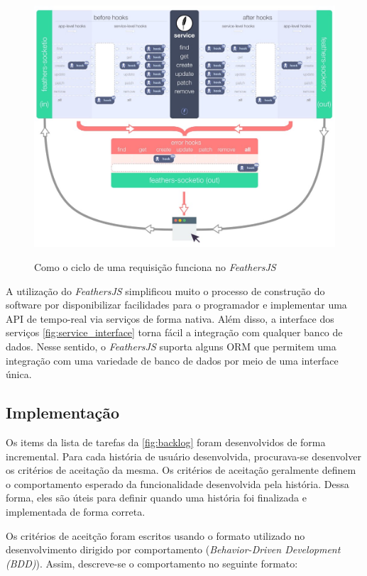 \begin{figure}[!ht]
  \centering
  \caption{Como o ciclo de uma requisição funciona no \textit{FeathersJS}}
  \includegraphics[scale=0.45,valign=t]{imagens/feathers_request.jpeg}
  \fonte{}
  \label{fig:feathers_request}
\end{figure}

A utilização do \textit{FeathersJS} simplificou muito o processo de construção
do software por disponibilizar facilidades para o programador e implementar
uma API de tempo-real via serviços de forma nativa. Além disso, a interface dos
serviços \autoref{fig:service_interface} torna fácil a integração com qualquer banco de dados.
Nesse sentido, o \textit{FeathersJS} suporta alguns ORM que permitem uma integração
com uma variedade de banco de dados por meio de uma interface única.

\subsection{Implementação}\label{subsection:implementation}

Os items da lista de tarefas da \autoref{fig:backlog} foram desenvolvidos de forma incremental.
Para cada história de usuário desenvolvida, procurava-se desenvolver os critérios de aceitação da mesma.
Os critérios de aceitação geralmente definem o comportamento esperado da funcionalidade desenvolvida pela história.
Dessa forma, eles são úteis para definir quando uma história foi finalizada e implementada de forma correta.

Os critérios de aceitção foram escritos usando o formato utilizado no desenvolvimento dirigido por
comportamento (\textit{Behavior-Driven Development (BDD)}). Assim, descreve-se o comportamento no seguinte formato:

